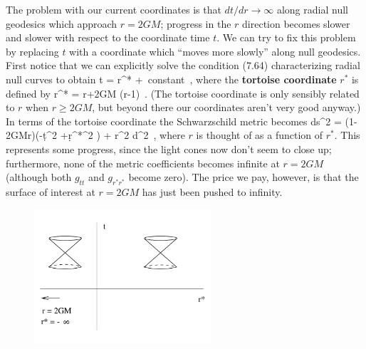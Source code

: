 \documentclass[12pt]{article}
\begin{document}
The problem with our current coordinates is that
$dt/dr\rightarrow \infty$ along radial null geodesics which approach
$r=2GM$; progress in the $r$ direction becomes slower and slower with
respect to the coordinate time $t$.  We can try to fix this problem
by replacing $t$ with a coordinate which ``moves more slowly'' along
null geodesics.  First notice that we can explicitly solve the
condition (7.64) characterizing radial null curves to obtain
\be
  t = \pm r^* +{\rm ~constant}\ ,\label{7.65}
\ee
where the {\bf tortoise coordinate} $r^*$ is defined by
\be
  r^* = r+2GM \ln\left({{r}}-1\right)\ .\label{7.66}
\ee
(The tortoise coordinate is only sensibly related to $r$ when
$r\geq 2GM$, but beyond there our coordinates aren't very good
anyway.)  In terms of 
the tortoise coordinate the Schwarzschild metric becomes
\be
  ds^2 = \left(1-{{2GM}\over r}\right)\left(-\d t^2 
  +\d {r^*}^2 \right) + r^2 d\Omega^2\ ,\label{7.67}
\ee
where $r$ is thought of as a function of $r^*$.
This represents some progress, since the light cones now don't
seem to close up; furthermore, none of the metric coefficients becomes
infinite at $r=2GM$ (although both $g_{tt}$ and $g_{r^* r^*}$ become
zero).  The price we pay, however, is that the surface
of interest at $r=2GM$ has just been pushed to infinity.

\begin{figure}
  \centerline{
  \includegraphics[height=5cm]{pdf/seven11}}
\end{figure}
\end{document}
